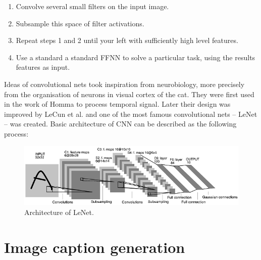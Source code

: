 \begin{minipage}{0.9\textwidth}
\begin{enumerate}
	\item Convolve several small filters on the input image.
	\item Subsample this space of filter activations.
	\item Repeat steps 1 and 2 until your left with sufficiently high level features.
	\item Use a standard a standard FFNN to solve a particular task, using the results features as input.
\end{enumerate}
\end{minipage}

\vspace{1cm}

Ideas of convolutional nets took inspiration from neurobiology, more precisely from the organisation of neurons in visual cortex of the cat. They were first used in the work of Homma \cite{NIPS1987_20} to process temporal signal. Later their design was improved by LeCun et al. \cite{lecun-98} and one of the most famous convolutional nets -- LeNet -- was created. Basic architecture of CNN can be described as the following process:


	
\begin{figure}[!ht]
	\centering
	\includegraphics[width=\textwidth]{./fig/lenet-architecture.png}
	\caption{Architecture of LeNet. \cite{lecun-98}
		\label{fig:lenet}}
\end{figure}	
	

\chapter{Image caption generation}

